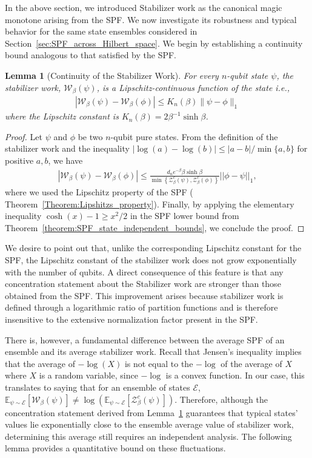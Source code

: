 \documentclass[aps,pra,superscriptaddress,twocolumn,longbibliography]{revtex4-2}
\newcommand{\eqs}[1]{\begin{align}#1\end{align}}
\newtheorem{lemma}{\textbf{Lemma}}
\def\mW{\mathcal{W}}
\begin{document}
In the above section, we introduced Stabilizer work as the canonical magic monotone arising from the SPF.
We now investigate its robustness and typical behavior for the same state ensembles considered in Section~\ref{sec:SPF_across_Hilbert_space}. We begin by establishing a continuity bound analogous to that satisfied by the SPF.
%
\begin{lemma}[Continuity of the Stabilizer Work]
\label{lemma:stab_work_lipshizts}
For every $n$-qubit state $\psi$, the stabilizer work, $\mathcal{W}_{\beta}(\psi)$, is a Lipschitz-continuous function of the state i.e., 
\eqs{|\mW_{\beta}(\psi)-\mW_{\beta}(\phi)|\leq K_n(\beta)\|\psi-\phi\|_1
}
where the Lipschitz constant is $K_{n}(\beta)=2\beta^{-1}\sinh{\beta}$.
%    
\end{lemma}
\begin{proof}
Let $\psi$ and $\phi$ be two $n$-qubit pure states. From the definition of
the stabilizer work and the inequality
$|\log(a)-\log(b)|\leq |a-b|/\min\{a,b\}$ for positive $a,b$, we have
%
\eqs{\label{eq:tighter_ub_SW_diff}
\left|\mathcal{W}_{\beta}(\psi)-\mathcal{W}_{\beta}(\phi)\right|
\leq\frac{
d_{n}e^{-\beta}\beta \sinh{\beta}}{\min\left\{
\mathcal{Z}_{\beta}^{c}(\psi),
\mathcal{Z}_{\beta}^{c}(\phi)\right\}}\left||\phi-\psi|\right|_{1},
}
%
where we used the Lipschitz property of the SPF ( Theorem~\ref{Theorem:Lipshitzs_property}). 
Finally, by applying the elementary inequality $\cosh(x)-1\geq x^2/2$ in the SPF lower bound from Theorem~\ref{theorem:SPF_state_independent_bounds}, we conclude the proof.
\end{proof}


We desire to point out that, unlike the corresponding Lipschitz constant for the SPF, the Lipschitz constant of the stabilizer work does not grow exponentially with the number of qubits. 
A direct consequence of this feature is that any concentration statement about the Stabilizer work are stronger than those obtained from the SPF.
This improvement arises because stabilizer work is defined through a logarithmic ratio of partition functions and is therefore insensitive to the extensive normalization factor present in the SPF.

There is, however, a fundamental difference between the average SPF of an ensemble and its average stabilizer work.
Recall that Jensen's inequality implies that the average of $-\log(X)$ is not equal to the $-\log$ of the average of $X$ where $X$ is a random variable, since $-\log$ is a convex function.
In our case, this translates to saying that for an ensemble of states $\mathcal{E}$, $\mathbb{E}_{\psi \sim \mathcal{E}}[\mathcal{W}_{\beta}(\psi)]\neq \log (\mathbb{E}_{\psi \sim \mathcal{E}}[\mathcal{Z}^{c}_{\beta}(\psi)])$.
Therefore, although the concentration statement derived from Lemma~\ref{lemma:stab_work_lipshizts} guarantees that typical states' values lie exponentially close to the ensemble average value of stabilizer work, determining this average still requires an independent analysis.
The following lemma provides a quantitative bound on these fluctuations.
\end{document}
